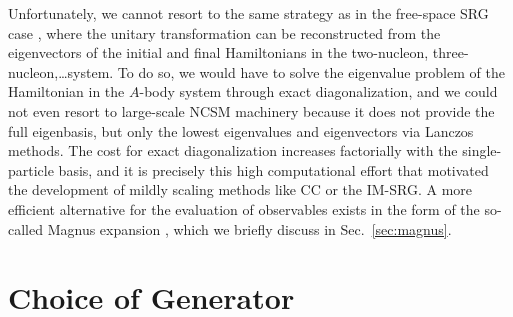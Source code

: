 Unfortunately, we cannot resort to the same strategy as in the free-space SRG case \cite{Anderson:2010br,Bogner:2010pq}, where the unitary transformation can be reconstructed from the eigenvectors of the initial and final Hamiltonians in the two-nucleon, three-nucleon,\ldots system. To do so, we would have to solve the eigenvalue problem of the Hamiltonian in the $A$-body system through exact diagonalization, and we could not even resort to large-scale NCSM machinery because it does not provide the full eigenbasis, but only the lowest eigenvalues and eigenvectors via Lanczos methods. The cost for exact diagonalization increases factorially with the single-particle basis, and it is precisely this high computational effort that motivated the development of mildly scaling methods like CC or the IM-SRG. A more efficient alternative for the evaluation of observables exists in the form of the so-called Magnus expansion \cite{Blanes:2009fk,Morris:2015ve}, which we briefly discuss in Sec.~\ref{sec:magnus}.



\section{\label{sec:generators}Choice of Generator}

